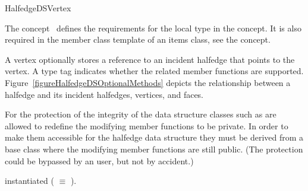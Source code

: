 
\ccRefPageBegin



\begin{ccRefConcept}{HalfedgeDSVertex}
\label{pageHalfedgeDSItemsVertexRef}

\ccDefinition
  
The concept \ccRefName\ defines the requirements for the local  
type in the  concept. It is also required in 
the  member class template of an
items class, see the  concept.

A vertex optionally stores a reference to an incident halfedge that
points to the vertex. A type tag indicates whether the related member
functions are supported. 
Figure~\ref{figureHalfedgeDSOptionalMethods} 
depicts the relationship between a halfedge and its incident
halfedges, vertices, and faces.

For the protection of the integrity of the data structure classes such as
 are allowed to redefine the modifying member 
functions to be private. In order to make them accessible for the 
halfedge data structure they must be derived from a base class 
where the modifying member functions are still public. (The protection 
could be bypassed by an user, but not by accident.)

\ccTypes
{}
\ccThreeToTwo

    {instantiated  ( $\equiv$ ).}
\ccGlue
{}
\ccGlue
{}
\ccGlue
{}
\ccGlue
{}
\ccGlue
{}
\ccGlue
{}
\ccGlue
{}
\ccGlue
{}
\ccGlue
{}
\ccGlue
{}


\end{ccRefConcept}
